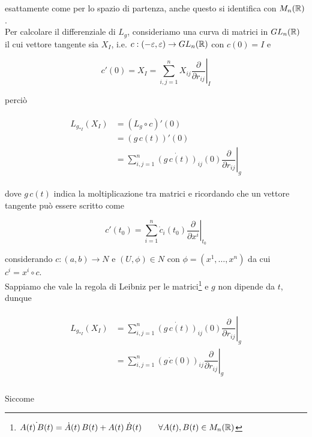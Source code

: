 esattamente come per lo spazio di partenza, anche questo si identifica con $ M_{n}(\mathbb{R}) $.\\
Per calcolare il differenziale di $ L_{g} $, consideriamo una curva di matrici in $ GL_{n}(\mathbb{R}) $ il cui vettore tangente sia $ X_{I} $, i.e. $ c : (-\varepsilon,\varepsilon) \to GL_{n}(\mathbb{R}) $ con $ c(0)=I $ e 

\begin{equation}
	c'(0) = X_{I} = \sum_{i,j=1}^{n} X_{ij} \left. \dfrac{\partial}{\partial r_{ij}} \right|_{I}
\end{equation}

perciò

\begin{align}
	\begin{split}
		L_{g_{*I}}(X_{I}) &= (L_{g} \circ c)'(0)\\
		&= (g \, c(t))'(0)\\
		&= \sum_{i,j=1}^{n} \dot{(g \, c(t))}_{ij}(0) \left. \dfrac{\partial}{\partial r_{ij}} \right|_{g}
	\end{split}
\end{align}

dove $ g \, c(t) $ indica la moltiplicazione tra matrici e ricordando che un vettore tangente può essere scritto come

\begin{equation}
	c'(t_{0}) = \sum_{i=1}^{n} \dot{c}_{i}(t_{0}) \left. \dfrac{\partial}{\partial x^{i}} \right|_{t_{0}}
\end{equation}

considerando $ c : (a,b) \to N $ e $ (U,\phi) \in N $ con $ \phi=(x^{1},\dots,x^{n}) $ da cui $ c^{i} = x^{i} \circ c $.\\
Sappiamo che vale la regola di Leibniz per le matrici\footnote{%
	$ \dot{A(t) \, B(t)} = \dot{A}(t) \, B(t) + A(t) \, \dot{B}(t) \qquad \forall A(t),B(t) \in M_{n}(\mathbb{R}) $%
} e $ g $ non dipende da $ t $, dunque

\begin{align}
	\begin{split}
		L_{g_{*I}}(X_{I}) &= \sum_{i,j=1}^{n} \dot{(g \, c(t))}_{ij}(0) \left. \dfrac{\partial}{\partial r_{ij}} \right|_{g}\\
		&= \sum_{i,j=1}^{n} (g \, \dot{c}(0))_{ij} \left. \dfrac{\partial}{\partial r_{ij}} \right|_{g}\\
	\end{split}
\end{align}

Siccome

